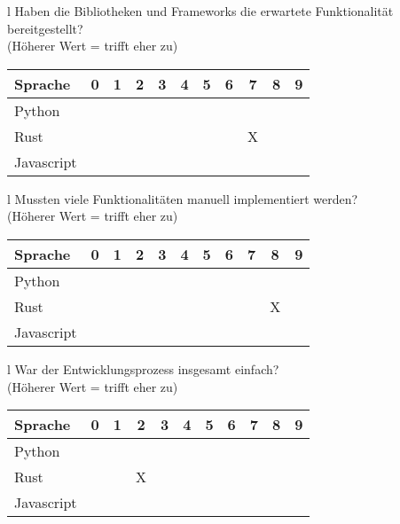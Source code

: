 \begin{tabular}{l}
	Haben die Bibliotheken und Frameworks die erwartete Funktionalität bereitgestellt? \\
	(Höherer Wert = trifft eher zu)                                                    \\
	\begin{tabular}{| l | c | c | c | c | c | c | c | c | c | c |}
		\hline
		Sprache    & 0 & 1 & 2 & 3 & 4 & 5 & 6 & 7 & 8 & 9 \\
		\hline
		Python     &   &   &   &   &   &   &   &   &   &   \\
		\hline
		Rust       &   &   &   &   &   &   &   & X &   &   \\
		\hline
		Javascript &   &   &   &   &   &   &   &   &   &   \\
		\hline
	\end{tabular}
\end{tabular}

\begin{tabular}{l}
	Mussten viele Funktionalitäten manuell implementiert werden? \\
	(Höherer Wert = trifft eher zu)                              \\
	\begin{tabular}{| l | c | c | c | c | c | c | c | c | c | c |}
		\hline
		Sprache    & 0 & 1 & 2 & 3 & 4 & 5 & 6 & 7 & 8 & 9 \\
		\hline
		Python     &   &   &   &   &   &   &   &   &   &   \\
		\hline
		Rust       &   &   &   &   &   &   &   &   & X &   \\
		\hline
		Javascript &   &   &   &   &   &   &   &   &   &   \\
		\hline
	\end{tabular}
\end{tabular}

\begin{tabular}{l}
	War der Entwicklungsprozess insgesamt einfach? \\
	(Höherer Wert = trifft eher zu)                \\
	\begin{tabular}{| l | c | c | c | c | c | c | c | c | c | c |}
		\hline
		Sprache    & 0 & 1 & 2 & 3 & 4 & 5 & 6 & 7 & 8 & 9 \\
		\hline
		Python     &   &   &   &   &   &   &   &   &   &   \\
		\hline
		Rust       &   &   & X &   &   &   &   &   &   &   \\
		\hline
		Javascript &   &   &   &   &   &   &   &   &   &   \\
		\hline
	\end{tabular}
\end{tabular}


